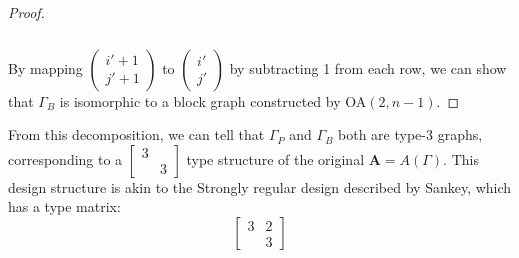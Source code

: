 \documentclass{article}
\begin{document}
\begin{proof}
\begin{align*}
\end{align*} \\
By mapping \(\begin{pmatrix} i'+1 \\ j'+1 \end{pmatrix}\) to \(\begin{pmatrix} i' \\ j' \end{pmatrix}\) by subtracting 1 from each row, we can show that \(\Gamma_B\) is isomorphic to a block graph constructed by OA\((2,n-1)\).
\end{proof}

From this decomposition, we can tell that \(\Gamma_P\) and \(\Gamma_B\) both are type-3 graphs, corresponding to a \(\begin{bmatrix}
    3 &  \\
      & 3
\end{bmatrix}\) type structure of the original \(\mathbf{A} = A(\Gamma)\).
This design structure is akin to the Strongly regular design described by Sankey\cite{sankey_srd}, which has a type matrix:
\[
\begin{bmatrix}
    3 & 2 \\
    & 3
\end{bmatrix}
\]
\end{document}
